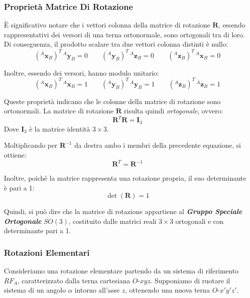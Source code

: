 \documentclass[11pt, a4paper]{report}
\begin{document}
\subsubsection{Proprietà Matrice Di Rotazione}

È significativo notare che i vettori colonna della matrice di rotazione $\mathbf{R}$, essendo rappresentativi dei versori di una terna ortonormale, sono ortogonali tra di loro. Di conseguenza, il prodotto scalare tra due vettori colonna distinti è nullo:
\[
    ({}^{A}\mathbf{x}_{B})^{T} \, {}^{A}\mathbf{y}_{B} = 0
    \qquad
    ({}^{A}\mathbf{y}_{B})^{T} \, {}^{A}\mathbf{z}_{B} = 0
    \qquad
    ({}^{A}\mathbf{z}_{B})^{T} \, {}^{A}\mathbf{x}_{B} = 0
\]

Inoltre, essendo dei versori, hanno modulo unitario:
\[
    ({}^{A}\mathbf{x}_{B})^{T} \, {}^{A}\mathbf{x}_{B} = 1
    \qquad
    ({}^{A}\mathbf{y}_{B})^{T} \, {}^{A}\mathbf{y}_{B} = 1
    \qquad
    ({}^{A}\mathbf{z}_{B})^{T} \, {}^{A}\mathbf{z}_{B} = 1
\]

Queste proprietà indicano che le colonne della matrice di rotazione sono ortonormali. La matrice di rotazione $\mathbf{R}$ risulta quindi \textit{ortogonale}, ovvero:
\[
    \mathbf{R}^{T}\mathbf{R} = \mathbf{I}_{3}
\]
Dove $\mathbf{I}_{3}$ è la matrice identità $3 \times 3$.

Moltiplicando per $\mathbf{R}^{-1}$ da destra ambo i membri della precedente equazione, si ottiene:
\[
    \mathbf{R}^{T} = \mathbf{R}^{-1}
\]

Inoltre, poiché la matrice rappresenta una rotazione propria, il suo determinante è pari a 1:
\[
    \det(\mathbf{R}) = 1
\]

Quindi, si può dire che la matrice di rotazione appartiene al \textbf{\textit{Gruppo Speciale Ortogonale}} $SO(3)$, costituito dalle matrici reali $3 \times 3$ ortogonali e con determinante pari a 1.
\newpage

\subsubsection{Rotazioni Elementari}

Consideriamo una rotazione elementare partendo da un sistema di riferimento $ RF_A $, caratterizzato dalla terna cartesiana $ O\text{-}xyz $. Supponiamo di ruotare il sistema di un angolo $\alpha$ intorno all'asse $z$, ottenendo una nuova terna $ O\text{-}x'y'z' $.
\end{document}
